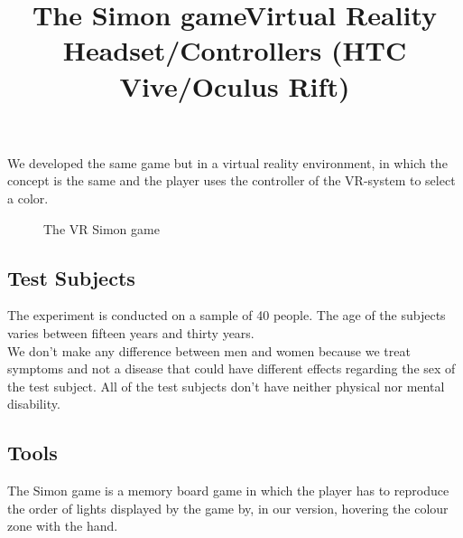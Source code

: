 \documentclass[12pt, openany, twocolumn]{article}
\begin{document}
    We developed the same game but in a virtual reality environment, in which the concept is the same and the player uses the controller of the VR-system to select a color.
    \begin{figure}[H]
        \setlength{\fboxsep}{0pt}
        \setlength{\fboxrule}{1pt}
        \caption{The VR Simon game}
    \end{figure}

    \subsection{Test Subjects}
    The experiment is conducted on a sample of 40 people. The age of the subjects varies between fifteen years and thirty years.
    \\

    We don’t make any difference between men and women because we treat symptoms and not a disease that could have different effects regarding the sex of the test subject. All of the test subjects don’t have neither physical nor mental disability.
    
    \subsection{Tools}
        \title{\textbf{The Simon game}} \vspace{0.25cm}

        \noindent The Simon game is a memory board game in which the player has to reproduce the order of lights displayed by the game by, in our version, hovering the colour zone with the hand. \\

        \noindent \title{\textbf{Virtual Reality Headset/Controllers (HTC Vive/Oculus Rift)}} \vspace{0.25cm}
\end{document}
